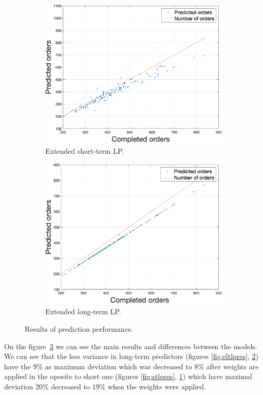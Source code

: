 \begin{figure}[h!]
        \begin{subfigure}[b]{0.49\textwidth}
            \includegraphics[width=\textwidth]{figures/expCompELP.png}
            \caption{Extended short-term LP.}
            \label{fig:eslpmse}
        \end{subfigure}
        \begin{subfigure}[b]{0.49\textwidth}
            \includegraphics[width=\textwidth]{figures/expCompELTLP.png}
            \caption{Extended long-term LP.}
            \label{fig:eltlpmse}
        \end{subfigure}
        \caption{Results of prediction performance.}
        \label{fig:mseresults}
    \end{figure}
    
    On the figure~\ref{fig:mseresults} we can see the main results and
    differences between the models. We can see that the less variance in
    long-term predictors (figures \ref{fig:eltlpres}, \ref{fig:eltlpmse}) have the 
    9\% as maximum deviation which was decreased to 8\% after weights are applied
    in the oposite to short one (figures \ref{fig:stlpres}, \ref{fig:eslpmse}) which have
    maximal deviation 20\% decreased to 19\% when the weights were applied.